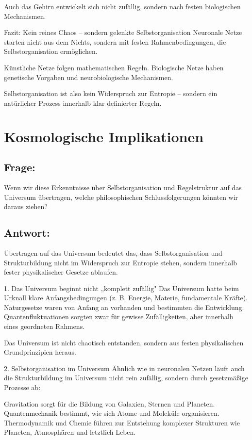 \documentclass{article}
\begin{document}
	Auch das Gehirn entwickelt sich nicht zufällig, sondern nach festen biologischen Mechanismen.
	
	Fazit: Kein reines Chaos – sondern gelenkte Selbstorganisation
	Neuronale Netze starten nicht aus dem Nichts, sondern mit festen Rahmenbedingungen, die Selbstorganisation ermöglichen.
	
	Künstliche Netze folgen mathematischen Regeln.
	Biologische Netze haben genetische Vorgaben und neurobiologische Mechanismen.
	
	Selbstorganisation ist also kein Widerspruch zur Entropie – sondern ein natürlicher Prozess innerhalb klar definierter Regeln.
	
	\section{Kosmologische Implikationen}
	
	\subsection*{Frage:}
	Wenn wir diese Erkenntnisse über Selbstorganisation und Regelstruktur auf das Universum übertragen, welche philosophischen Schlussfolgerungen könnten wir daraus ziehen?
	
	\subsection*{Antwort:}
	Übertragen auf das Universum bedeutet das, dass Selbstorganisation und Strukturbildung nicht im Widerspruch zur Entropie stehen, sondern innerhalb fester physikalischer Gesetze ablaufen.
	
	1. Das Universum beginnt nicht „komplett zufällig"
	Das Universum hatte beim Urknall klare Anfangsbedingungen (z. B. Energie, Materie, fundamentale Kräfte).
	Naturgesetze waren von Anfang an vorhanden und bestimmten die Entwicklung.
	Quantenfluktuationen sorgten zwar für gewisse Zufälligkeiten, aber innerhalb eines geordneten Rahmens.
	
	Das Universum ist nicht chaotisch entstanden, sondern aus festen physikalischen Grundprinzipien heraus.
	
	2. Selbstorganisation im Universum
	Ähnlich wie in neuronalen Netzen läuft auch die Strukturbildung im Universum nicht rein zufällig, sondern durch gesetzmäßige Prozesse ab:
	
	Gravitation sorgt für die Bildung von Galaxien, Sternen und Planeten.
	Quantenmechanik bestimmt, wie sich Atome und Moleküle organisieren.
	Thermodynamik und Chemie führen zur Entstehung komplexer Strukturen wie Planeten, Atmosphären und letztlich Leben.
	
\end{document}
